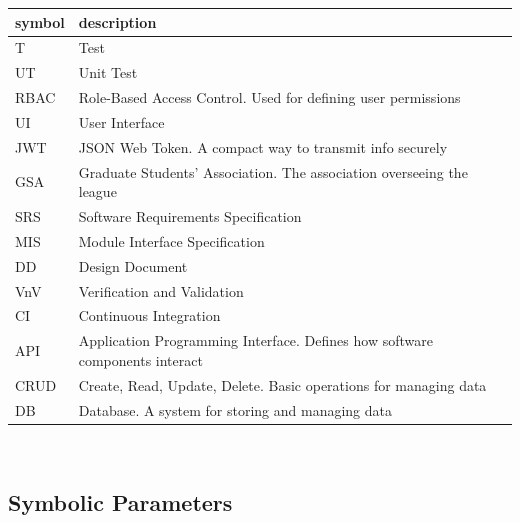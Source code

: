 \documentclass[12pt, titlepage]{article}
\begin{document}
\renewcommand{\arraystretch}{1.2}
\begin{tabular}{l l}
    \toprule
    \textbf{symbol} & \textbf{description}                                                  \\
    \midrule
    T               & Test                                                                  \\
    UT              & Unit Test                                                             \\
    RBAC            & Role-Based Access Control. Used for defining user permissions         \\
    UI              & User Interface                                                        \\
    JWT             & JSON Web Token. A compact way to transmit info securely               \\
    GSA             & Graduate Students' Association. The association overseeing the league \\
    SRS             & Software Requirements Specification                                   \\
    MIS             & Module Interface Specification                                        \\
    DD              & Design Document                                                       \\
    VnV             & Verification and Validation                                           \\
    CI              & Continuous Integration                                                \\
    API             & Application Programming Interface. Defines how software components interact \\
    CRUD            & Create, Read, Update, Delete. Basic operations for managing data      \\
    DB              & Database. A system for storing and managing data                      \\
    \bottomrule
\end{tabular}\\


\subsection{Symbolic Parameters}
\end{document}
